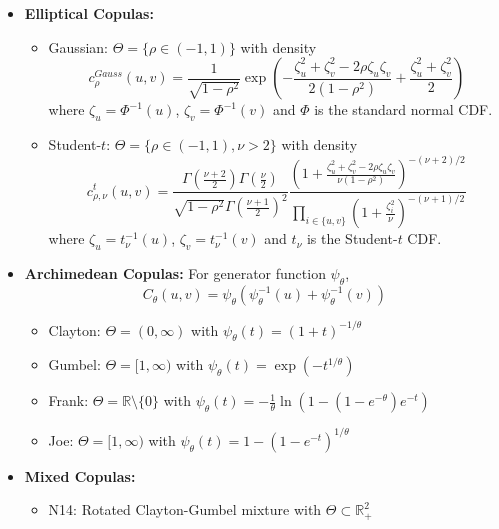 \begin{itemize}
\item \textbf{Elliptical Copulas:}
   \begin{itemize}
   \item Gaussian: $\Theta = \{\rho \in (-1,1)\}$ with density
   \[
   c_\rho^{Gauss}(u,v) = \frac{1}{\sqrt{1-\rho^2}} \exp\left(-\frac{\zeta_u^2 + \zeta_v^2 - 2\rho\zeta_u\zeta_v}{2(1-\rho^2)} + \frac{\zeta_u^2 + \zeta_v^2}{2}\right)
   \]
   where $\zeta_u = \Phi^{-1}(u)$, $\zeta_v = \Phi^{-1}(v)$ and $\Phi$ is the standard normal CDF.
   
   \item Student-$t$: $\Theta = \{\rho \in (-1,1), \nu > 2\}$ with density
   \[
   c_{\rho,\nu}^{t}(u,v) = \frac{\Gamma\left(\frac{\nu+2}{2}\right)\Gamma\left(\frac{\nu}{2}\right)}{\sqrt{1-\rho^2}\Gamma\left(\frac{\nu+1}{2}\right)^2} 
   \frac{\left(1 + \frac{\zeta_u^2 + \zeta_v^2 - 2\rho\zeta_u\zeta_v}{\nu(1-\rho^2)}\right)^{-(\nu+2)/2}}{\prod_{i\in\{u,v\}} \left(1 + \frac{\zeta_i^2}{\nu}\right)^{-(\nu+1)/2}}
   \]
   where $\zeta_u = t_\nu^{-1}(u)$, $\zeta_v = t_\nu^{-1}(v)$ and $t_\nu$ is the Student-$t$ CDF.
   \end{itemize}	

\item \textbf{Archimedean Copulas:} For generator function $\psi_\theta$, 
\[
C_\theta(u,v) = \psi_\theta(\psi_\theta^{-1}(u) + \psi_\theta^{-1}(v))
\]
    \begin{itemize}
    \item Clayton: $\Theta = (0, \infty)$ with $\psi_\theta(t) = (1 + t)^{-1/\theta}$
    \item Gumbel: $\Theta = [1, \infty)$ with $\psi_\theta(t) = \exp(-t^{1/\theta})$
    \item Frank: $\Theta = \mathbb{R}\setminus\{0\}$ with $\psi_\theta(t) = -\frac{1}{\theta}\ln\left(1 - (1 - e^{-\theta})e^{-t}\right)$
    \item Joe: $\Theta = [1, \infty)$ with $\psi_\theta(t) = 1 - (1 - e^{-t})^{1/\theta}$
    \end{itemize}

\item \textbf{Mixed Copulas:}
    \begin{itemize}
    \item N14: Rotated Clayton-Gumbel mixture with $\Theta \subset \mathbb{R}^2_+$
    \end{itemize}
\end{itemize}

